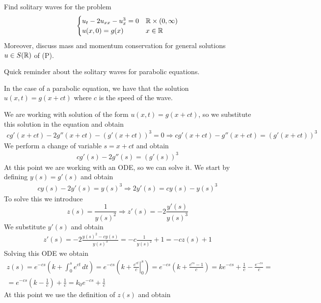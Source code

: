 \newpage
\begin{exercise}
    Find solitary waves for the problem
    \[
        \begin{cases}
            u_t - 2u_{xx} - u_x^3 = 0 & \mathbb{R} \times (0, \infty) \\
            u(x, 0) = g(x)            & x \in \mathbb{R}
        \end{cases}
    \]
    Moreover, discuss mass and momentum conservation for general solutions \(u \in
    S(\mathbb{R})\) of (P).
\end{exercise}
Quick reminder about the solitary waves for parabolic equations.
\begin{remark}
    In the case of a parabolic equation, we have that the solution \(u(x,t) =  g(x + ct)\) where \(c\) is the speed of the wave.
\end{remark}
We are working with solution of the form \(u(x,t) = g(x + ct)\), so we substitute this solution in the equation and obtain
\[
    \begin{split}
        cg'(x+ct) - 2g''(x+ct) - (g'(x+ct))^3 = 0 \Rightarrow cg'(x+ct) - g''(x+ct) = (g'(x+ct))^3
    \end{split}
\]
We perform a change of variable \(s = x + ct\) and obtain
\[
    \begin{split}
        cg'(s) - 2g''(s) = (g'(s))^3
    \end{split}
\]
At this point we are working with an ODE, so we can solve it. We start by
defining \(y(s) = g'(s)\) and obtain
\[
    \begin{split}
        cy(s) - 2y'(s) = y(s)^3 \Rightarrow 2y'(s) = cy(s) - y(s)^3
    \end{split}
\]
To solve this we introduce
\[
    z(s) = \frac{1}{y(s)^2} \Rightarrow z'(s) = -2 \frac{y'(s)}{y(s)^3}
\]
We substitute \(y'(s)\) and obtain
\[
    \begin{split}
        z'(s) = -2 \frac{y(s)^2 - cy(s)}{y(s)^3} = -c \frac{1}{y(s)^2} + 1 = -c z(s) + 1
    \end{split}
\]
Solving this ODE we obtain
\[
    \begin{split}
        z(s) = e^{-cs} \left(k + \int_0^s e^{ct} \, dt\right) = e^{-cs} \left(k + \left. \frac{e^{ct}}{c} \right|_0^s\right) = e^{-cs} \left(k + \frac{e^{cs} - 1}{c}\right) = k e^{-cs} + \frac{1}{c} - \frac{e^{-cs}}{c} = \\
        = e^{-cs} \left(k - \frac{1}{c}\right) + \frac{1}{c} = k_0 e^{-cs} + \frac{1}{c}
    \end{split}
\]
At this point we use the definition of \(z(s)\) and obtain
